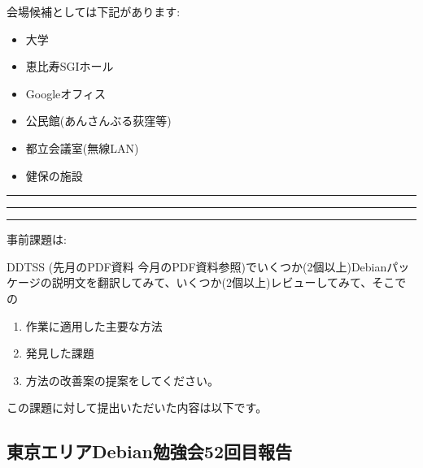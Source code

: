 \documentclass[mingoth,a4paper]{jsarticle}
\begin{document}
\begin{multicols}{2}
 会場候補としては下記があります:

 \begin{itemize}
  \item 大学
  \item 恵比寿SGIホール
  \item Googleオフィス
  \item 公民館(あんさんぶる荻窪等)
  \item 都立会議室(無線LAN)
  \item 健保の施設
 \end{itemize}

\end{multicols}


\newpage

\begin{minipage}[b]{0.2\hsize}
 \colorbox{titleback}{}
\end{minipage}
\begin{minipage}[b]{0.8\hsize}
\hrule
\vspace{2mm}
\hrule

\setcounter{tocdepth}{1}
\tableofcontents
\vspace{2mm}
\hrule
\end{minipage}


事前課題は:

DDTSS (先月のPDF資料 今月のPDF資料参照)でいくつか(2個以上)Debianパッケージの説明文を翻訳してみて、いくつか(2個以上)レビューしてみて、そこでの

\begin{enumerate}
 \item 作業に適用した主要な方法
 \item 発見した課題
 \item 方法の改善案の提案をしてください。
\end{enumerate}

この課題に対して提出いただいた内容は以下です。

\begin{multicols}{2}

\end{multicols}

%
%

\subsection{東京エリアDebian勉強会52回目報告}
\end{document}
